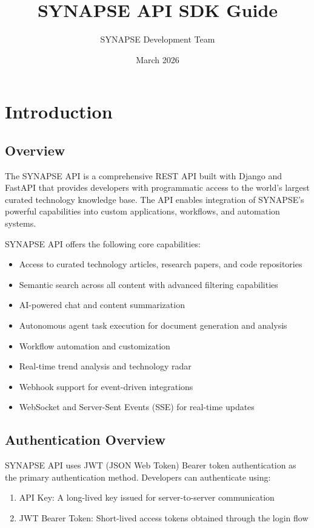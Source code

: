 \documentclass{report}
\title{SYNAPSE API SDK Guide}
\author{SYNAPSE Development Team}
\date{March 2026}
\begin{document}
\maketitle

\tableofcontents
\newpage

\chapter{Introduction}

\section{Overview}

The SYNAPSE API is a comprehensive REST API built with Django and FastAPI that provides developers with programmatic access to the world's largest curated technology knowledge base. The API enables integration of SYNAPSE's powerful capabilities into custom applications, workflows, and automation systems.

SYNAPSE API offers the following core capabilities:

\begin{itemize}
    \item Access to curated technology articles, research papers, and code repositories
    \item Semantic search across all content with advanced filtering capabilities
    \item AI-powered chat and content summarization
    \item Autonomous agent task execution for document generation and analysis
    \item Workflow automation and customization
    \item Real-time trend analysis and technology radar
    \item Webhook support for event-driven integrations
    \item WebSocket and Server-Sent Events (SSE) for real-time updates
\end{itemize}

\section{Authentication Overview}

SYNAPSE API uses JWT (JSON Web Token) Bearer token authentication as the primary authentication method. Developers can authenticate using:

\begin{enumerate}
    \item API Key: A long-lived key issued for server-to-server communication
    \item JWT Bearer Token: Short-lived access tokens obtained through the login flow
\end{enumerate}
\end{document}
